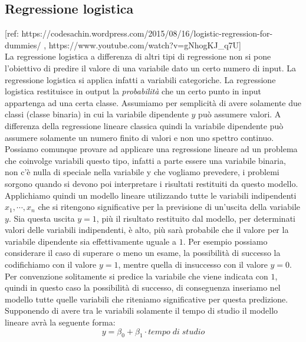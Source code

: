 \documentclass[]{article}
\begin{document}
\subsection{Regressione logistica}
[ref: https://codesachin.wordpress.com/2015/08/16/logistic-regression-for-dummies/ , https://www.youtube.com/watch?v=gNhogKJ\_q7U]\\
La regressione logistica a differenza di altri tipi di regressione non si pone l'obiettivo di predire il valore di una variabile dato un certo numero di input. La regressione logistica si applica infatti a variabili categoriche. La regressione logistica restituisce in output la \textit{probabilità} che un certo punto in input appartenga ad una certa classe. Assumiamo per semplicità di avere solamente due classi (classe binaria) in cui la variabile dipendente $y$ può assumere valori. A differenza della regressione lineare classica quindi la variabile dipendente può assumere solamente un numero finito di valori e non uno spettro continuo. Possiamo comunque provare ad applicare una regressione lineare ad un problema che coinvolge variabili questo tipo, infatti a parte essere una variabile binaria, non c'è nulla di speciale nella variabile y che vogliamo prevedere, i problemi sorgono quando si devono poi interpretare i risultati restituiti da questo modello. Applichiamo quindi un modello lineare utilizzando tutte le variabili indipendenti $x_1, \cdots, x_n$ che si ritengono significative per la previsione di un'uscita della variabile $y$. Sia questa uscita $y=1$, più il risultato restituito dal modello, per determinati valori delle variabili indipendenti, è alto, più sarà probabile che il valore per la variabile dipendente sia effettivamente uguale a $1$. Per esempio possiamo considerare il caso di superare o meno un esame, la possibilità di successo la codifichiamo con il valore $y=1$, mentre quella di insuccesso con il valore $y=0$. Per convenzione solitamente si predice la variabile che viene indicata con $1$, quindi in questo caso la possibilità di successo, di conseguenza inseriamo nel modello tutte quelle variabili che riteniamo significative per questa predizione. Supponendo di avere tra le variabili solamente il tempo di studio il modello lineare avrà la seguente forma:
\begin{equation}
y = \beta_0 + \beta_1\cdot tempo\;di\;studio
\label{eq: esempio-regressione-lineare-logistica}
\end{equation}
\end{document}
